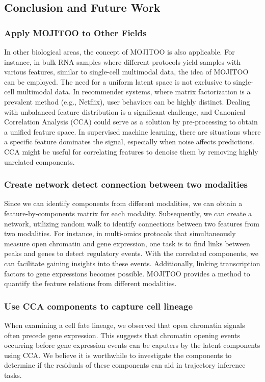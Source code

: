 \subsection{Conclusion and Future Work}

\subsubsection{Apply MOJITOO to Other Fields}
In other biological areas, the concept of MOJITOO is also applicable. For instance, in bulk RNA samples where different protocols yield samples with various features, similar to single-cell multimodal data, the idea of MOJITOO can be employed. The need for a uniform latent space is not exclusive to single-cell multimodal data. In recommender systems, where matrix factorization is a prevalent method (e.g., Netflix), user behaviors can be highly distinct. Dealing with unbalanced feature distribution is a significant challenge, and Canonical Correlation Analysis (CCA) could serve as a solution by pre-processing to obtain a unified feature space. In supervised machine learning, there are situations where a specific feature dominates the signal, especially when noise affects predictions. CCA might be useful for correlating features to denoise them by removing highly unrelated components.


\subsubsection{Create network detect connection between two modalities}
Since we can identify components from different modalities, we can obtain a feature-by-components matrix for each modality. Subsequently, we can create a network, utilizing random walk to identify connections between two features from two modalities. For instance, in multi-omics protocols that simultaneously measure open chromatin and gene expression, one task is to find links between peaks and genes to detect regulatory events. With the correlated components, we can facilitate gaining insights into these events. Additionally, linking transcription factors to gene expressions becomes possible. MOJITOO provides a method to quantify the feature relations from different modalities.

\subsubsection{Use CCA components to capture cell lineage}
When examining a cell fate lineage, we observed that open chromatin signals often precede gene expression. This suggests that chromatin opening events occurring before gene expression events can be caputers by the latent components using CCA. We believe it is worthwhile to investigate the components to determine if the residuals of these components can aid in trajectory inference tasks.


